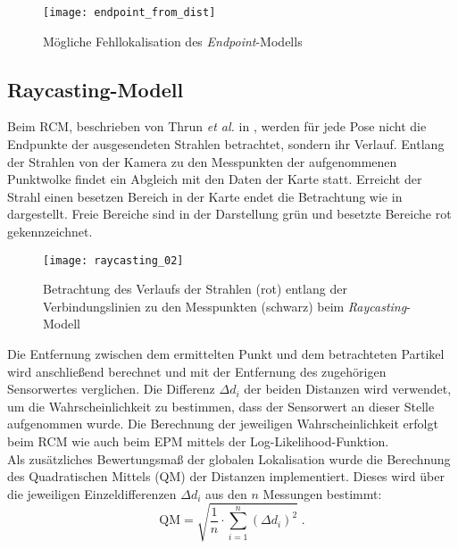 \begin{figure}[!ht]
	\begin{center}
		\texttt{[image: endpoint\_from\_dist]}
		\caption{Mögliche Fehllokalisation des \textit{Endpoint}-Modells}
		\label{fig.endpoint}
	\end{center}
\end{figure}

\subsection{Raycasting-Modell}
Beim RCM, beschrieben von Thrun \textit{et al.} in \cite{Thrun2005}, werden für jede Pose nicht die Endpunkte der ausgesendeten Strahlen betrachtet, sondern ihr Verlauf. Entlang der Strahlen von der Kamera zu den Messpunkten der aufgenommenen Punktwolke findet ein Abgleich mit den Daten der Karte statt. Erreicht der Strahl einen besetzen Bereich in der Karte endet die Betrachtung wie in  dargestellt. Freie Bereiche sind in der Darstellung grün und besetzte Bereiche rot gekennzeichnet.\\

\begin{figure}[!ht]
	\begin{center}
		\texttt{[image: raycasting\_02]}
		\caption{Betrachtung des Verlaufs der Strahlen (rot) entlang der Verbindungslinien zu den Messpunkten (schwarz) beim \textit{Raycasting}-Modell}
		\label{fig.raycast}
	\end{center}
\end{figure}

\prever{
}
Die Entfernung zwischen dem ermittelten Punkt und dem betrachteten Partikel wird anschließend berechnet und mit der Entfernung des zugehörigen Sensorwertes verglichen. Die Differenz ${\Delta d}_i$ der beiden Distanzen wird verwendet, um die Wahrscheinlichkeit zu bestimmen, dass der Sensorwert an dieser Stelle aufgenommen wurde. Die Berechnung der jeweiligen Wahrscheinlichkeit erfolgt beim RCM wie auch beim EPM mittels der Log-Likelihood-Funktion.\\

Als zusätzliches Bewertungsmaß der globalen Lokalisation wurde die Berechnung des Quadratischen Mittels (QM) der Distanzen implementiert. Dieses wird über die jeweiligen Einzeldifferenzen ${\Delta d}_i$ aus den $n$ Messungen bestimmt:
%
\begin{equation}
\mathrm{QM} = \sqrt{\frac{1}{n} \cdot \sum_{i=1}^n{({\Delta d}_i)^2}} \; \text{.}
\end{equation}

